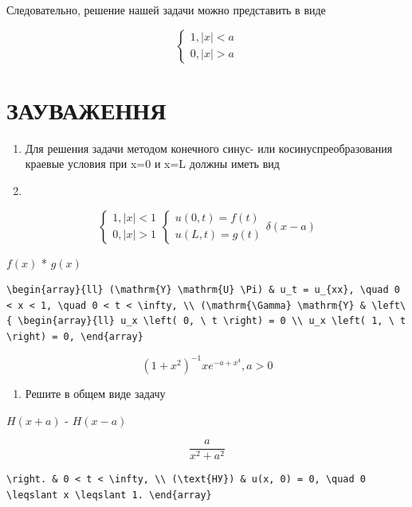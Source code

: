 \documentclass[
  ukrainian,
]{article}
\providecommand{\tightlist}{%
  \setlength{\itemsep}{0pt}\setlength{\parskip}{0pt}}
\begin{document}
Следовательно, решение нашей задачи можно представить в виде

\[
\begin{cases} 1, |x| < a \\ 0, |x| > a \end{cases}
\]

\section{ЗАУВАЖЕННЯ}\label{ux437ux430ux443ux432ux430ux436ux435ux43dux43dux44f-10}

\begin{enumerate}
\def\labelenumi{\arabic{enumi}.}
\item
  Для решения задачи методом конечного синус- или косинуспреобразования
  краевые условия при x=0 и x=L должны иметь вид
\item
\end{enumerate}

\[
\begin{cases} 1, |x| < 1 \\ 0, |x| > 1 \end{cases}
\begin{cases} u(0, t) = f(t) \\ u(L, t) = g(t) \end{cases}
\delta(x-a)
\]

\(f(x)\) * \(g(x)\)

\begin{verbatim}
\begin{array}{ll} (\mathrm{Y} \mathrm{U} \Pi) & u_t = u_{xx}, \quad 0 < x < 1, \quad 0 < t < \infty, \\ (\mathrm{\Gamma} \mathrm{Y} & \left\{ \begin{array}{ll} u_x \left( 0, \ t \right) = 0 \\ u_x \left( 1, \ t \right) = 0, \end{array}
\end{verbatim}

\[
(1+x^2)^{-1}
xe^{-a+x^4}, a > 0
\]

\begin{enumerate}
\def\labelenumi{\arabic{enumi}.}
\setcounter{enumi}{1}
\tightlist
\item
  Решите в общем виде задачу
\end{enumerate}

\(H(x+a)\) - \(H(x-a)\)

\[
\frac{a}{x^2+a^2}
\]

\begin{verbatim}
\right. & 0 < t < \infty, \\ (\text{НУ}) & u(x, 0) = 0, \quad 0 \leqslant x \leqslant 1. \end{array}
\end{verbatim}
\end{document}
